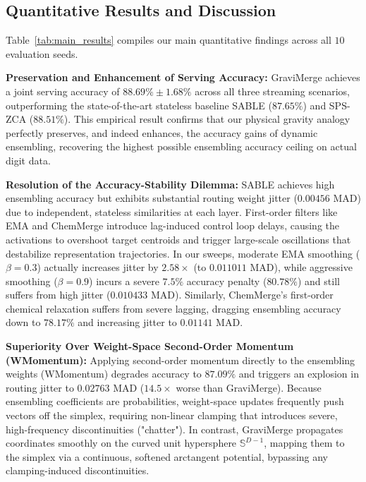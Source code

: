 \vspace{-5pt}
\subsection{Quantitative Results and Discussion}
Table~\ref{tab:main_results} compiles our main quantitative findings across all $10$ evaluation seeds.

\textbf{Preservation and Enhancement of Serving Accuracy: }
GraviMerge achieves a joint serving accuracy of $\mathbf{88.69\% \pm 1.68\%}$ across all three streaming scenarios, outperforming the state-of-the-art stateless baseline SABLE ($87.65\%$) and SPS-ZCA ($88.51\%$). This empirical result confirms that our physical gravity analogy perfectly preserves, and indeed enhances, the accuracy gains of dynamic ensembling, recovering the highest possible ensembling accuracy ceiling on actual digit data.

\textbf{Resolution of the Accuracy-Stability Dilemma: }
SABLE achieves high ensembling accuracy but exhibits substantial routing weight jitter ($0.00456$ MAD) due to independent, stateless similarities at each layer. First-order filters like EMA and ChemMerge introduce lag-induced control loop delays, causing the activations to overshoot target centroids and trigger large-scale oscillations that destabilize representation trajectories. In our sweeps, moderate EMA smoothing ($\beta = 0.3$) actually increases jitter by $2.58\times$ (to $0.011011$ MAD), while aggressive smoothing ($\beta = 0.9$) incurs a severe $7.5\%$ accuracy penalty ($80.78\%$) and still suffers from high jitter ($0.010433$ MAD). Similarly, ChemMerge's first-order chemical relaxation suffers from severe lagging, dragging ensembling accuracy down to $78.17\%$ and increasing jitter to $0.01141$ MAD. 

\textbf{Superiority Over Weight-Space Second-Order Momentum (WMomentum): }
Applying second-order momentum directly to the ensembling weights (WMomentum) degrades accuracy to $87.09\%$ and triggers an explosion in routing jitter to $0.02763$ MAD ($14.5\times$ worse than GraviMerge). Because ensembling coefficients are probabilities, weight-space updates frequently push vectors off the simplex, requiring non-linear clamping that introduces severe, high-frequency discontinuities ("chatter"). In contrast, GraviMerge propagates coordinates smoothly on the curved unit hypersphere $\mathbb{S}^{D-1}$, mapping them to the simplex via a continuous, softened arctangent potential, bypassing any clamping-induced discontinuities.

